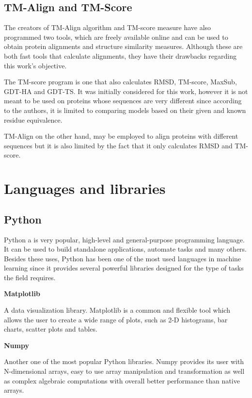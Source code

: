 \subsection{TM-Align and TM-Score}

The creators of TM-Align algorithm and TM-score measure have also programmed two tools, which are freely available online and can be used to obtain protein alignments and structure similarity measures. Although these are both fast tools that calculate alignments, they have their drawbacks regarding this work's objective. 

The TM-score program is one that also calculates RMSD, TM-score, MaxSub, GDT-HA and GDT-TS. It was initially considered for this work, however it is not meant to be used on proteins whose sequences are very different since according to the authors, it is limited to comparing models based on their given and known residue equivalence.

TM-Align on the other hand, may be employed to align proteins with different sequences but it is also limited by the fact that it only calculates RMSD and TM-score.

\section{Languages and libraries}

\subsection{Python}

Python a is very popular, high-level and general-purpose programming language. It can be used to build standalone applications, automate tasks and many others. Besides these uses, Python has been one of the most used languages in machine learning since it provides several powerful libraries designed for the type of tasks the field requires.

\textbf{Matplotlib}

A data visualization library. Matplotlib is a common and flexible tool which allows the user to create a wide range of plots, such as 2-D histograms, bar charts, scatter plots and tables. \cite{Hunter2007}

\medskip
\textbf{Numpy}

Another one of the most popular Python libraries. Numpy provides its user with N-dimensional arrays, easy to use array manipulation and transformation as well as complex algebraic computations with overall better performance than native arrays. \cite{walt2011numpy}

